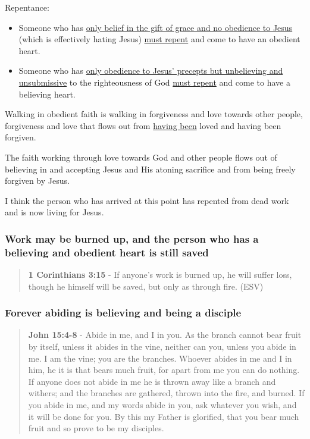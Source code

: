 \documentclass[11pt]{article}
\begin{document}
Repentance:
\begin{itemize}
\item Someone who has \uline{only belief in the gift of grace and no obedience to Jesus} (which is effectively hating Jesus) \uline{must repent} and come to have an obedient heart.
\item Someone who has \uline{only obedience to Jesus' precepts but unbelieving and unsubmissive} to the righteousness of God \uline{must repent} and come to have a believing heart.
\end{itemize}

Walking in obedient faith is walking in forgiveness and love towards other people, forgiveness and love that flows out from \uline{having been} loved and having been forgiven.

The faith working through love towards God and other people flows out of believing in and accepting Jesus and His atoning sacrifice and from being freely forgiven by Jesus.

I think the person who has arrived at this point has repented from dead work and is now living for Jesus.

\subsubsection{Work may be burned up, and the person who has a believing and obedient heart is still saved}
\label{sec:org6fa4e9c}
\begin{quote}
\textbf{1 Corinthians 3:15} - If anyone's work is burned up, he will suffer loss, though he himself will be saved, but only as through fire. (ESV)
\end{quote}

\subsubsection{Forever abiding is believing and being a disciple}
\label{sec:orga4fbe7c}
\begin{quote}
\textbf{John 15:4-8} - Abide in me, and I in you. As the branch cannot bear fruit by itself, unless it abides in the vine, neither can you, unless you abide in me. I am the vine; you are the branches. Whoever abides in me and I in him, he it is that bears much fruit, for apart from me you can do nothing. If anyone does not abide in me he is thrown away like a branch and withers; and the branches are gathered, thrown into the fire, and burned. If you abide in me, and my words abide in you, ask whatever you wish, and it will be done for you. By this my Father is glorified, that you bear much fruit and so prove to be my disciples.
\end{quote}
\end{document}
